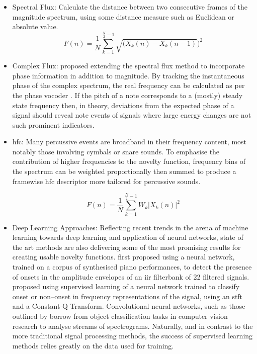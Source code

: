 \begin{itemize}
\item Spectral Flux: Calculate the distance between two consecutive frames of the magnitude spectrum, using some distance measure such as Euclidean or absolute value.
\begin{equation}
\label{eq:Spectral Flux}	
F(n)=\frac{1}{N}\sum_{k=1}^{\frac{N}{2}-1}\sqrt{(X_{k}(n)-X_{k}(n-1)})^{2}
\end{equation}
\item Complex Flux: \cite{Bello2004} proposed extending the spectral flux method to incorporate phase information in addition to magnitude. By tracking the instantaneous phase of the complex spectrum, the real frequency can be calculated as per the phase vocoder \citep{Roads1996}. If the pitch of a note corresponds to a (mostly) steady state frequency then, in theory, deviations from the expected phase of a signal should reveal note events of signals where large energy changes are not such prominent indicators.
\item \acrfull{hfc}: Many percussive events are broadband in their frequency content, most notably those involving cymbals or snare sounds. To emphasise the contribution of higher frequencies to the novelty function, frequency bins of the spectrum can be weighted proportionally then summed to produce a framewise \acrshort{hfc} descriptor more tailored for percussive sounds.

\begin{equation}
\label{eq:High Frequency Content}	
F(n)=\frac{1}{N}\sum_{k=1}^{\frac{N}{2}-1}W_{k}|X_{k}(n)|^{2}
\end{equation}

\item Deep Learning Approaches: Reflecting recent trends in the arena of machine learning towards deep learning and application of neural networks, state of the art methods are also delivering some of the most promising results for creating usable novelty functions. \cite{Marolt2002} first proposed using a neural network, trained on a corpus of synthesised piano performances, to detect the presence of onsets in the amplitude envelopes of an \acrshort{iir} filterbank of 22 filtered signals.  \cite{Lacoste2007} proposed using supervised learning of a neural network trained to classify onset or non–onset in frequency representations of the signal, using an \acrshort{stft} and a Constant-Q Transform. Convolutional neural networks, such as those outlined by \cite{Schluter2013, Schluter2014} borrow from object classification tasks in computer vision research to analyse streams of spectrograms. Naturally, and in contrast to the more traditional signal processing methods, the success of supervised learning methods relies greatly on the data used for training.
\end{itemize}

